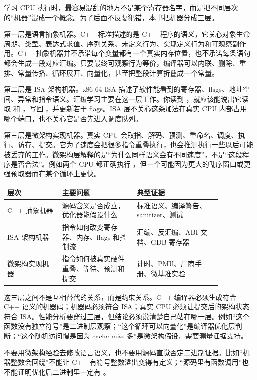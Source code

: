 学习 CPU 执行时，最容易混乱的地方不是某个寄存器名字，而是把不同层次的“机器”混成一个概念。为了后面不反复犯错，本书把机器分成三层。

第一层是语言抽象机器。C++ 标准描述的是 C++ 程序的语义，它关心对象生命周期、类型、表达式求值、序列关系、未定义行为、实现定义行为和可观察副作用。C++ 抽象机器并不承诺每个变量都有一个真实内存位置，也不承诺每条语句都会生成一段对应汇编。只要最终可观察行为等价，编译器可以内联、删除、重排、常量传播、循环展开、向量化，甚至把整段计算折叠成一个常量。

第二层是 ISA 架构机器。x86-64 ISA 描述了软件能看到的寄存器、flags、地址空间、异常和指令语义。汇编学习主要在这一层工作。你读到 ，就应该能说出它读取  和 ，写回 ，并更新若干 flags。ISA 层不关心这条加法在真实 CPU 内部占用哪个端口，也不关心它是否先进入调度队列。

第三层是微架构实现机器。真实 CPU 会取指、解码、预测、重命名、调度、执行、访存、提交。它为了速度会把很多指令重叠执行，也会推测执行一些以后可能被丢弃的工作。微架构层解释的是“为什么同样语义会有不同速度”，不是“这段程序是否合法”。例如两个 CPU 都正确执行 ，但一个可能因为更大的乱序窗口或更强预取器而在某个循环上更快。

\begin{center}
\begin{tabular}{p{0.22\linewidth}p{0.30\linewidth}p{0.34\linewidth}}
\toprule
层次 & 主要问题 & 典型证据 \\
\midrule
C++ 抽象机器 & 源码含义是否成立，优化器能假设什么 & 标准语义、编译警告、sanitizer、测试 \\
ISA 架构机器 & 指令如何改变寄存器、内存、flags 和控制流 & 汇编、反汇编、ABI 文档、GDB 寄存器 \\
微架构实现机器 & 指令如何被真实硬件重叠、等待、预测和提交 & 计时、PMU、厂商手册、微基准实验 \\
\bottomrule
\end{tabular}
\end{center}

这三层之间不是互相替代的关系，而是约束关系。C++ 编译器必须生成符合 C++ 语义的机器码；机器码必须符合 ISA；真实 CPU 必须让提交后的架构状态符合 ISA。性能分析要穿过三层，但结论必须说清楚自己站在哪一层。例如“这个函数没有独立符号”是二进制层观察；“这个循环可以向量化”是编译器优化层判断；“这个随机访问慢是因为 cache miss 多”是微架构假设，需要测量证据支持。

\begin{warningbox}
不要用微架构经验去修改语言语义，也不要用源码直觉否定二进制证据。比如“机器整数会回绕”不能让 C++ 有符号整数溢出变得有定义；“源码里有函数调用”也不能证明优化后二进制里一定有 。
\end{warningbox}

